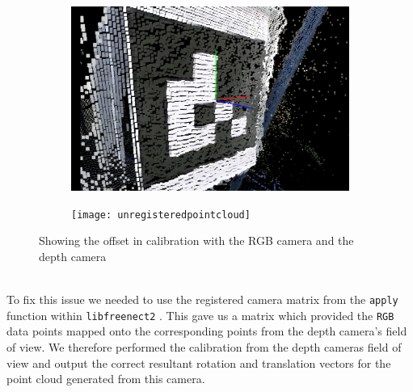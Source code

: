 \documentclass{article}
\begin{document}
\begin{figure}[h]
\centering
\begin{subfigure}{.49\textwidth}
  \centering
  \includegraphics[scale=0.2]{registeredpointcloud}
\end{subfigure}
\begin{subfigure}{.49\textwidth}
  \centering
  \texttt{[image: unregisteredpointcloud]}
\end{subfigure}
  \caption{Showing the offset in calibration with the RGB camera and the depth camera}
  \label{fig:calibrationoffset}
\end{figure}
\\
To fix this issue we needed to use the registered camera matrix from the \texttt{apply} function within \texttt{libfreenect2} \cite{libfreenect}. This gave us a matrix which provided the \texttt{RGB} data points mapped onto the corresponding points from the depth camera's field of view. We therefore performed the calibration from the depth cameras field of view and output the correct resultant rotation and translation vectors for the point cloud generated from this camera.
\newpage
\end{document}
